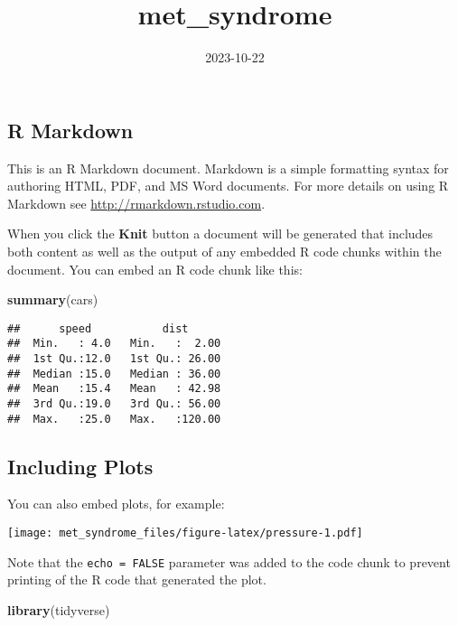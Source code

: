 \documentclass[
]{article}
\title{met\_syndrome}
\author{}
\date{\vspace{-2.5em}2023-10-22}
\newenvironment{Shaded}{\begin{snugshade}}{\end{snugshade}}
\newcommand{\FunctionTok}[1]{\textcolor[rgb]{0.13,0.29,0.53}{\textbf{#1}}}
\newcommand{\NormalTok}[1]{#1}
\begin{document}
\maketitle

\hypertarget{r-markdown}{%
\subsection{R Markdown}\label{r-markdown}}

This is an R Markdown document. Markdown is a simple formatting syntax
for authoring HTML, PDF, and MS Word documents. For more details on
using R Markdown see \url{http://rmarkdown.rstudio.com}.

When you click the \textbf{Knit} button a document will be generated
that includes both content as well as the output of any embedded R code
chunks within the document. You can embed an R code chunk like this:

\begin{Shaded}
\begin{Highlighting}[]
\FunctionTok{summary}\NormalTok{(cars)}
\end{Highlighting}
\end{Shaded}

\begin{verbatim}
##      speed           dist       
##  Min.   : 4.0   Min.   :  2.00  
##  1st Qu.:12.0   1st Qu.: 26.00  
##  Median :15.0   Median : 36.00  
##  Mean   :15.4   Mean   : 42.98  
##  3rd Qu.:19.0   3rd Qu.: 56.00  
##  Max.   :25.0   Max.   :120.00
\end{verbatim}

\hypertarget{including-plots}{%
\subsection{Including Plots}\label{including-plots}}

You can also embed plots, for example:

\texttt{[image: met\_syndrome\_files/figure-latex/pressure-1.pdf]}

Note that the \texttt{echo\ =\ FALSE} parameter was added to the code
chunk to prevent printing of the R code that generated the plot.

\begin{Shaded}
\begin{Highlighting}[]
\FunctionTok{library}\NormalTok{(tidyverse)}
\end{Highlighting}
\end{Shaded}
\end{document}
